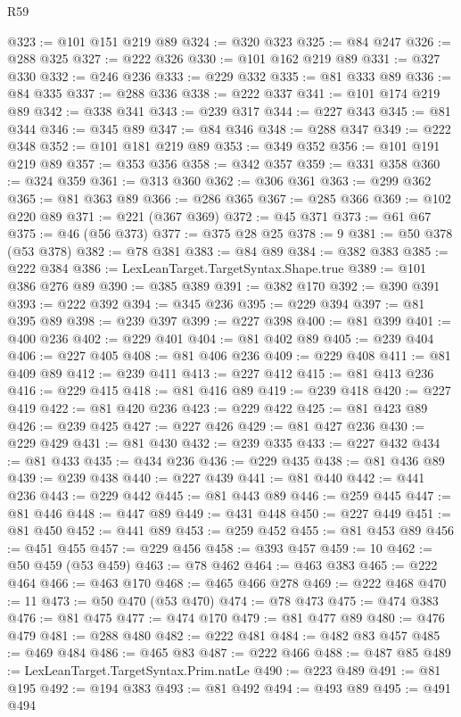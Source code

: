 \begin{lexlean}{R59}
\begin{coremodule}
@323 := @101 @151 @219 @89
@324 := @320 @323
@325 := @84 @247
@326 := @288 @325
@327 := @222 @326
@330 := @101 @162 @219 @89
@331 := @327 @330
@332 := @246 @236
@333 := @229 @332
@335 := @81 @333 @89
@336 := @84 @335
@337 := @288 @336
@338 := @222 @337
@341 := @101 @174 @219 @89
@342 := @338 @341
@343 := @239 @317
@344 := @227 @343
@345 := @81 @344
@346 := @345 @89
@347 := @84 @346
@348 := @288 @347
@349 := @222 @348
@352 := @101 @181 @219 @89
@353 := @349 @352
@356 := @101 @191 @219 @89
@357 := @353 @356
@358 := @342 @357
@359 := @331 @358
@360 := @324 @359
@361 := @313 @360
@362 := @306 @361
@363 := @299 @362
@365 := @81 @363 @89
@366 := @286 @365
@367 := @285 @366
@369 := @102 @220 @89
@371 := @221 (@367 @369)
@372 := @45 @371
@373 := @61 @67
@375 := @46 (@56 @373)
@377 := @375 @28 @25
@378 := 9
@381 := @50 @378 (@53 @378)
@382 := @78 @381
@383 := @84 @89
@384 := @382 @383
@385 := @222 @384
@386 := LexLeanTarget.TargetSyntax.Shape.true
@389 := @101 @386 @276 @89
@390 := @385 @389
@391 := @382 @170
@392 := @390 @391
@393 := @222 @392
@394 := @345 @236
@395 := @229 @394
@397 := @81 @395 @89
@398 := @239 @397
@399 := @227 @398
@400 := @81 @399
@401 := @400 @236
@402 := @229 @401
@404 := @81 @402 @89
@405 := @239 @404
@406 := @227 @405
@408 := @81 @406 @236
@409 := @229 @408
@411 := @81 @409 @89
@412 := @239 @411
@413 := @227 @412
@415 := @81 @413 @236
@416 := @229 @415
@418 := @81 @416 @89
@419 := @239 @418
@420 := @227 @419
@422 := @81 @420 @236
@423 := @229 @422
@425 := @81 @423 @89
@426 := @239 @425
@427 := @227 @426
@429 := @81 @427 @236
@430 := @229 @429
@431 := @81 @430
@432 := @239 @335
@433 := @227 @432
@434 := @81 @433
@435 := @434 @236
@436 := @229 @435
@438 := @81 @436 @89
@439 := @239 @438
@440 := @227 @439
@441 := @81 @440
@442 := @441 @236
@443 := @229 @442
@445 := @81 @443 @89
@446 := @259 @445
@447 := @81 @446
@448 := @447 @89
@449 := @431 @448
@450 := @227 @449
@451 := @81 @450
@452 := @441 @89
@453 := @259 @452
@455 := @81 @453 @89
@456 := @451 @455
@457 := @229 @456
@458 := @393 @457
@459 := 10
@462 := @50 @459 (@53 @459)
@463 := @78 @462
@464 := @463 @383
@465 := @222 @464
@466 := @463 @170
@468 := @465 @466 @278
@469 := @222 @468
@470 := 11
@473 := @50 @470 (@53 @470)
@474 := @78 @473
@475 := @474 @383
@476 := @81 @475
@477 := @474 @170
@479 := @81 @477 @89
@480 := @476 @479
@481 := @288 @480
@482 := @222 @481
@484 := @482 @83 @457
@485 := @469 @484
@486 := @465 @83
@487 := @222 @466
@488 := @487 @85
@489 := LexLeanTarget.TargetSyntax.Prim.natLe
@490 := @223 @489
@491 := @81 @195
@492 := @194 @383
@493 := @81 @492
@494 := @493 @89
@495 := @491 @494

\end{coremodule}
\end{lexlean}
